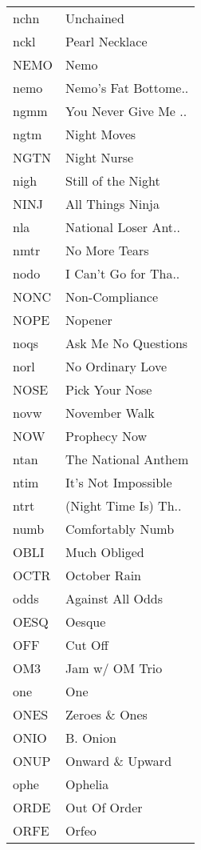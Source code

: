 \begin{supertabular}{ll}
 nchn &             Unchained \\
 nckl &        Pearl Necklace \\
 NEMO &                  Nemo \\
 nemo &  Nemo's Fat Bottome.. \\
 ngmm &  You Never Give Me .. \\
 ngtm &           Night Moves \\
 NGTN &           Night Nurse \\
 nigh &    Still of the Night \\
 NINJ &      All Things Ninja \\
  nla &  National Loser Ant.. \\
 nmtr &         No More Tears \\
 nodo &  I Can't Go for Tha.. \\
 NONC &        Non-Compliance \\
 NOPE &               Nopener \\
 noqs &   Ask Me No Questions \\
 norl &      No Ordinary Love \\
 NOSE &        Pick Your Nose \\
 novw &         November Walk \\
  NOW &          Prophecy Now \\
 ntan &   The National Anthem \\
 ntim &   It's Not Impossible \\
 ntrt &  (Night Time Is) Th.. \\
 numb &      Comfortably Numb \\
 OBLI &          Much Obliged \\
 OCTR &          October Rain \\
 odds &      Against All Odds \\
 OESQ &                Oesque \\
  OFF &               Cut Off \\
  OM3 &        Jam w/ OM Trio \\
  one &                   One \\
 ONES &         Zeroes \& Ones \\
 ONIO &              B. Onion \\
 ONUP &       Onward \& Upward \\
 ophe &               Ophelia \\
 ORDE &          Out Of Order \\
 ORFE &                 Orfeo \\

\end{supertabular}
